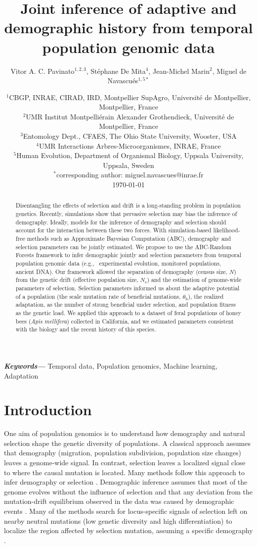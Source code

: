 \documentclass[a4paper, 12pt]{article}
\title{Joint inference of adaptive and demographic history from temporal population genomic data}
\author{\small
            Vitor A. C. Pavinato$^{1,2,3}$, Stéphane De Mita$^4$, Jean-Michel Marin$^2$, Miguel de Navascués$^{1,5*}$}
\date{{\footnotesize %
    $^1$CBGP, INRAE, CIRAD, IRD, Montpellier SupAgro, Université de Montpellier, Montpellier, France\\%
    $^2$UMR Institut Montpelliérain Alexander Grothendieck, Université de Montpellier, France \\%
    $^3$Entomology Dept., CFAES, The Ohio State University, Wooster, USA\\%
    $^4$UMR Interactions Arbres-Microorganismes, INRAE, France \\%
    $^5$Human Evolution, Department of Organismal Biology, Uppsala University, Uppsala, Sweden\\%
    $^*$corresponding author: miguel.navascues@inrae.fr\\[2ex]%
    }
    \footnotesize\today    
}
\providecommand{\keywords}[1]
{
  \small	
  \textbf{\textit{Keywords---}} #1
}
\begin{document}
\maketitle

\begin{abstract}
Disentangling the effects of selection and drift is a long-standing problem in population genetics. Recently, simulations show that pervasive selection may bias the inference of demography. Ideally, models for the inference of demography and selection should account for the interaction between these two forces.
With simulation-based likelihood-free methods such as Approximate Bayesian Computation (ABC), demography and selection parameters can be jointly estimated. We propose to use the ABC-Random Forests framework to infer demographic jointly and selection parameters from temporal population genomic data (e.g., \ experimental evolution, monitored populations, ancient DNA). Our framework allowed the separation of demography (census size, $N$) from the genetic drift (effective population size, $N_{\mathrm{e}}$) and the estimation of genome-wide parameters of selection. Selection parameters informed us about the adaptive potential of a population (the scale mutation rate of beneficial mutations, $\theta_{\mathrm{b}}$), the realized adaptation, as the number of strong beneficial under selection, and population fitness as the genetic load. We applied this approach to a dataset of feral populations of honey bees (\textit{Apis mellifera}) collected in California, and we estimated parameters consistent with the biology and the recent history of this species.
\end{abstract}\hspace{12pt}

\keywords{Temporal data, Population genomics, Machine learning, Adaptation}

\newpage

\section*{Introduction}

One aim of population genomics is to understand how demography and natural selection shape the genetic diversity of populations. A classical approach assumes that demography (migration, population subdivision, population size changes) leaves a genome-wide signal. In contrast, selection leaves a localized signal close to where the causal mutation is located. Many methods follow this approach to infer demography or selection \citep[reviewed by][]{Beichman:2018bx, Casillas:2017jv}. Demographic inference assumes that most of the genome evolves without the influence of selection and that any deviation from the mutation-drift equilibrium observed in the data was caused by demographic events \citep{Beichman:2018bx}. Many of the methods search for locus-specific signals of selection left on nearby neutral mutations \citep{Tajima:1989un, Fay:2000dl, Kim:2004ih} (low genetic diversity and high differentiation) to localize the region affected by selection mutation, assuming a specific demography \citep[constant population size in early methods;][]{Nielsen:2005kx, Pool:2010eh}.
\end{document}
